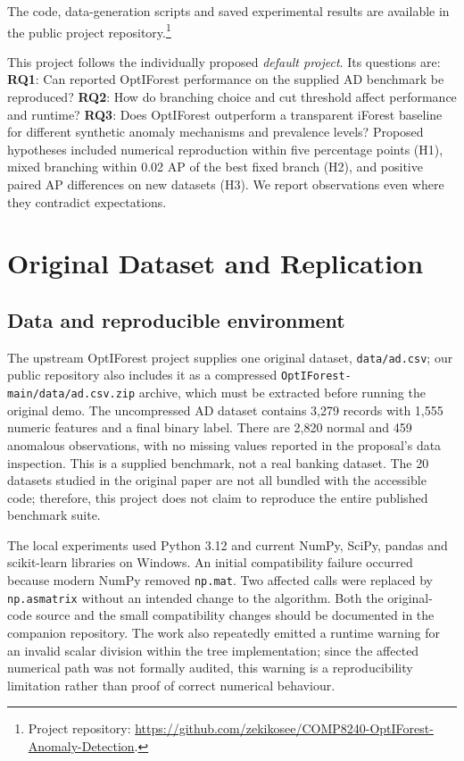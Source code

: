 \documentclass[11pt]{article}
\begin{document}
The code, data-generation scripts and saved experimental results are available in the public project repository.\footnote{Project repository: \url{https://github.com/zekikosee/COMP8240-OptIForest-Anomaly-Detection}.}

This project follows the individually proposed \emph{default project}. Its questions are: \textbf{RQ1}: Can reported OptIForest performance on the supplied AD benchmark be reproduced? \textbf{RQ2}: How do branching choice and cut threshold affect performance and runtime? \textbf{RQ3}: Does OptIForest outperform a transparent iForest baseline for different synthetic anomaly mechanisms and prevalence levels? Proposed hypotheses included numerical reproduction within five percentage points (H1), mixed branching within 0.02 AP of the best fixed branch (H2), and positive paired AP differences on new datasets (H3). We report observations even where they contradict expectations.
 
\section{Original Dataset and Replication}
\subsection{Data and reproducible environment}
The upstream OptIForest project supplies one original dataset, \texttt{data/ad.csv}; our public repository also includes it as a compressed \texttt{OptIForest-main/data/ad.csv.zip} archive, which must be extracted before running the original demo. The uncompressed AD dataset contains 3,279 records with 1,555 numeric features and a final binary label. There are 2,820 normal and 459 anomalous observations, with no missing values reported in the proposal's data inspection. This is a supplied benchmark, not a real banking dataset. The 20 datasets studied in the original paper are not all bundled with the accessible code; therefore, this project does not claim to reproduce the entire published benchmark suite.
 
The local experiments used Python 3.12 and current NumPy, SciPy, pandas and scikit-learn libraries on Windows. An initial compatibility failure occurred because modern NumPy removed \texttt{np.mat}. Two affected calls were replaced by \texttt{np.asmatrix} without an intended change to the algorithm. Both the original-code source and the small compatibility changes should be documented in the companion repository. The work also repeatedly emitted a runtime warning for an invalid scalar division within the tree implementation; since the affected numerical path was not formally audited, this warning is a reproducibility limitation rather than proof of correct numerical behaviour.
 
\end{document}
